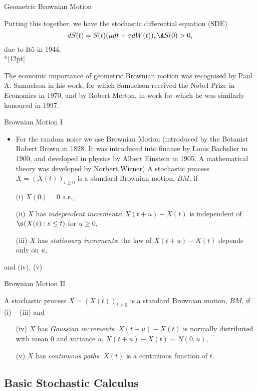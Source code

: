 {Geometric Brownian Motion}

Putting this together, we have the stochastic differential
equation (SDE)
\begin{equation}\label{GBM}
dS(t) = S(t) (\mu dt + \sigma dW(t)), \A S(0) > 0,
\end{equation}
due to It\^{o} in 1944.\\*[12pt]

The economic importance of geometric
Brownian motion was recognised by Paul A. Samuelson in his work, for which Samuelson received the Nobel
Prize in Economics in 1970, and by Robert Merton, in work for which he was similarly
honoured in 1997.

{Brownian Motion I}
\begin{itemize}
\item<1-> For the random noise we use Brownian Motion (introduced by the Botanist Robert Brown in
1828. It was introduced into finance by Louis Bachelier in 1900, and developed in physics by Albert Einstein in 1905.
A mathematical theory was developed by Norbert Wiener)
A stochastic process $X=(X(t))_{t \geq 0}$ is a standard
Brownian motion, $BM$, if
\item[(i)] $X(0) = 0$ a.s., \item[(ii)] $X$ has {\it independent
increments}: $X(t+u) - X(t)$ is independent of $\s (X(s): s \leq
t)$ for $u \geq 0$, \item[(iii)]  $X$ has {\it stationary
increments}: the law of $X(t+u) - X(t)$ depends only on $u$,
\end{itemize}
and (iv), (v)

{Brownian Motion II}

A stochastic process $X=(X(t))_{t \geq 0}$ is a standard
Brownian motion, $BM$, if (i) -- (iii) and
\begin{itemize}
\item[(iv)]  $X$ has {\it Gaussian increments}: $X(t+u) - X(t)$ is
normally distributed with mean $0$ and variance $u$, $X(t+u) -
X(t) \sim N(0,u)$, \item[(v)]  $X$ has {\it continuous paths}:
$X(t)$ is a continuous function of $t$.
\end{itemize}

\subsection{Basic Stochastic Calculus}

